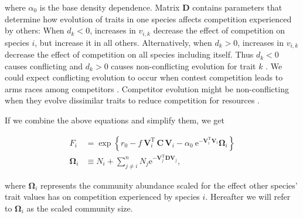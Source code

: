 \noindent where $\alpha_0$ is the base density dependence.
Matrix $\mathbf{D}$ contains parameters that determine how evolution of traits
in one species affects competition experienced by others:
When $d_k < 0$, increases in $v_{i,k}$ decrease the
effect of competition on species $i$, but increase it in all others.
Alternatively, when $d_k > 0$, increases in $v_{i,k}$ decrease the effect of
competition on all species including itself.
Thus $d_k < 0$ causes conflicting and $d_k > 0$ causes non-conflicting evolution
for trait $k$ \citep{Northfield:2013if}.
We could expect conflicting evolution to occur when contest competition
leads to arms races among competitors
\citep{Abrams:1994th}.
Competitor evolution might be non-conflicting when they evolve
dissimilar traits to reduce competition for resources \citep{Roughgarden:1976eh}.


If we combine the above equations and simplify them, we get

\begin{equation} \label{eq:fitness-full}
\begin{split}
    F_{i} &= \exp \left\{
        r_0 - f ~ 
        \mathbf{V}_i^{\textrm{T}} \, \mathbf{C} \, \mathbf{V}_{i} -
        \alpha_0 ~\textrm{e}^{- \mathbf{V}_i^{\textrm{T}} \mathbf{V}_i } \mathbf{\Omega}_{i}
        \right\} \\
        \mathbf{\Omega}_i &\equiv N_i +
            \sum_{j \ne i}^{n}{ N_j \textrm{e}^{
            - \mathbf{V}_j^{\textrm{T}}
            \mathbf{D} \mathbf{V}_j } }
        \textrm{,}
\end{split}
\end{equation}

\noindent where $\mathbf{\Omega}_i$ represents the community abundance scaled
for the effect other species' trait values has on competition
experienced by species $i$.
Hereafter we will refer to $\mathbf{\Omega}_i$ as the scaled community size.




%



